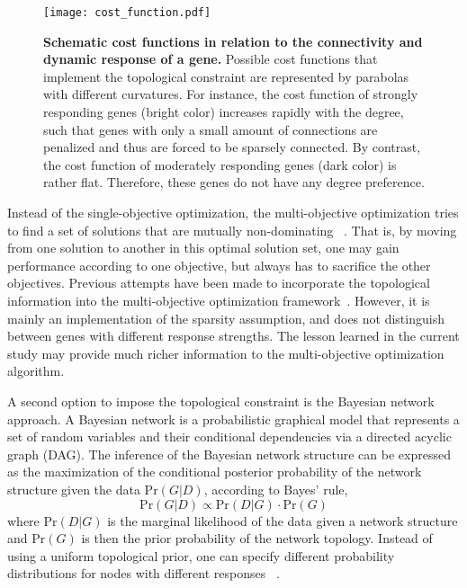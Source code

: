 \begin{figure}[!ht]
\begin{center}
\texttt{[image: cost\_function.pdf]}
\end{center}
\caption[Topological constraint in reverse-engineering]{
{\bf Schematic cost functions in relation to the connectivity and dynamic 
response of a gene.}
Possible cost functions that implement the topological constraint are
represented by parabolas with different curvatures. For instance, the 
cost function of strongly responding genes (bright color) increases
rapidly with the degree, such that genes with only a small amount of
connections are penalized and thus are forced to be sparsely connected.
By contrast, the cost function of moderately responding genes (dark color)
is rather flat. Therefore, these genes do not have any degree preference.
}
\label{fig:cost_function}
\end{figure}

Instead of the single-objective optimization, the multi-objective
optimization tries to find a set of solutions that are mutually non-dominating~%
\citep{Deb2002,Higuera2012}.
That is, by moving from one solution to another in this optimal solution set,
one may gain performance according to one objective, but always has to 
sacrifice the other objectives.
Previous attempts have been made to incorporate the topological information
into the multi-objective optimization framework~\citep{Spieth2005}. However,
it is mainly an implementation of the sparsity assumption, and does not
distinguish between genes with different response strengths. The lesson
learned in the current study may provide much richer information to the 
multi-objective optimization algorithm.

A second option to impose the topological constraint is the Bayesian network
approach. A Bayesian network is a probabilistic graphical model that represents 
a set of random variables and their conditional dependencies via a directed 
acyclic graph (DAG). The inference of the Bayesian network structure can be 
expressed as the maximization of the conditional posterior probability of 
the network structure given the data $\mathrm{Pr}(G|D)$, according to Bayes' rule,
\begin{equation}
\mathrm{Pr}(G|D) \propto \mathrm{Pr}(D|G) \cdot \mathrm{Pr}(G)
\end{equation}
where $\mathrm{Pr}(D|G)$ is the marginal likelihood of the data given a network 
structure and $\mathrm{Pr}(G)$ is then the prior probability of the network 
topology. Instead of using a uniform topological prior, one can specify 
different probability distributions for nodes with different responses~%
\citep{Friedman1998,Huang2007}.

